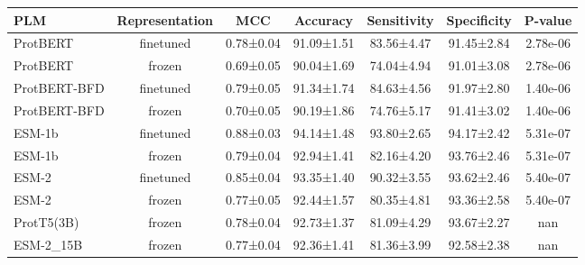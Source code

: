 \begin{tabular}{lcccccc}
\toprule
               PLM & Representation &       MCC &   Accuracy & Sensitivity & Specificity &  P-value \\
\midrule
ProtBERT &      finetuned & 0.78±0.04 & 91.09±1.51 &  83.56±4.47 &  91.45±2.84 & 2.78e-06 \\
ProtBERT &         frozen & 0.69±0.05 & 90.04±1.69 &  74.04±4.94 &  91.01±3.08 & 2.78e-06 \\
ProtBERT-BFD &      finetuned & 0.79±0.05 & 91.34±1.74 &  84.63±4.56 &  91.97±2.80 & 1.40e-06 \\
ProtBERT-BFD &         frozen & 0.70±0.05 & 90.19±1.86 &  74.76±5.17 &  91.41±3.02 & 1.40e-06 \\
      ESM-1b &      finetuned & 0.88±0.03 & 94.14±1.48 &  93.80±2.65 &  94.17±2.42 & 5.31e-07 \\
      ESM-1b &         frozen & 0.79±0.04 & 92.94±1.41 &  82.16±4.20 &  93.76±2.46 & 5.31e-07 \\
       ESM-2 &      finetuned & 0.85±0.04 & 93.35±1.40 &  90.32±3.55 &  93.62±2.46 & 5.40e-07 \\
       ESM-2 &         frozen & 0.77±0.05 & 92.44±1.57 &  80.35±4.81 &  93.36±2.58 & 5.40e-07 \\
        ProtT5(3B) &         frozen & 0.78±0.04 & 92.73±1.37 &  81.09±4.29 &  93.67±2.27 &      nan \\
        ESM-2_15B &         frozen & 0.77±0.04 & 92.36±1.41 &  81.36±3.99 &  92.58±2.38 &      nan \\
\bottomrule
\end{tabular}
